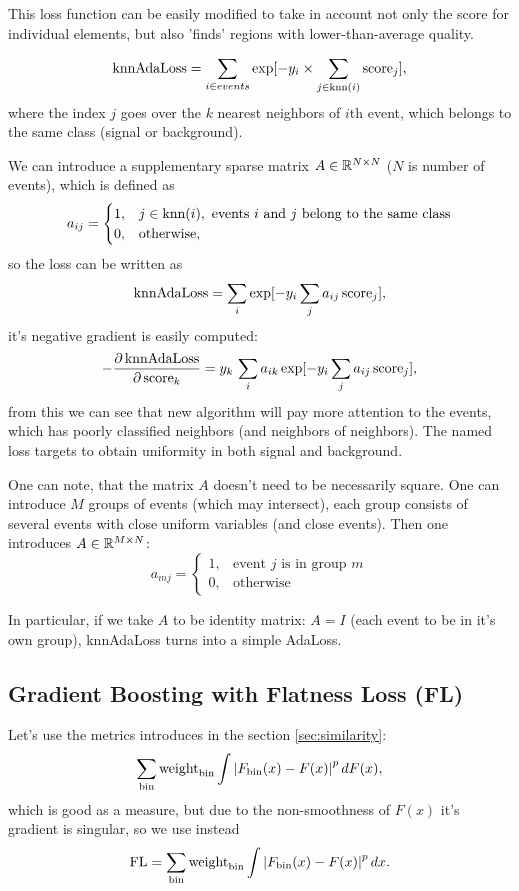 This loss function can be easily modified to take in account not only the score for individual elements, but also 'finds' regions with lower-than-average quality.

\[
	\text{knnAdaLoss} = \sum_{i \in events} \exp[-y_i \times \sum_{j \in \text{knn}(i)} \text{score}_j],
\]
where the index $j$ goes over the $k$ nearest neighbors of $i$th event, which belongs to the same class (signal or background).

We can introduce a supplementary sparse matrix $A \in \mathbb{R}^{N \times N}$ ($N$ is number of events), which is defined as 
\[
a_{ij} = \begin{cases} 
1, & j \in \text{knn}(i), \text{ events $i$ and $j$ belong to the same class} \\
0, & \text{otherwise},
\end{cases}
\] so the loss can be written as
\[
	\text{knnAdaLoss} = \sum_i \exp [- y_i \sum_j a_{ij} \, \text{score}_j ],
\]
it's negative gradient is easily computed:
\[
	-\dfrac{\partial \, \text{knnAdaLoss}} {\partial \, \text{score}_k} = 
	 y_k \, \sum_i a_{ik} \exp [- y_i \sum_j a_{ij} \, \text{score}_j ],
\]
from this we can see that new algorithm will pay more attention to the events, which has poorly classified neighbors (and neighbors of neighbors). The named loss targets to obtain uniformity in both signal and background.

One can note, that the matrix $A$ doesn't need to be necessarily square. One can introduce $M$ groups of events (which may intersect), each group consists of several events with close uniform variables (and close events). Then one introduces $A \in \mathbb{R}^{M \times N}$:
\[
	a_{mj} = \begin{cases}
		1, & \text{event $j$ is in group $m$} \\
		0, & \text{otherwise}
	\end{cases}
\]

In particular, if we take $A$ to be identity matrix: $A = I$ (each event to be in it's own group), knnAdaLoss turns into a simple AdaLoss.



\subsection{Gradient Boosting with Flatness Loss (FL)}

Let's use the metrics introduces in the section \ref{sec:similarity}:
\[
	\sum_{\text{bin}} \text{weight}_\text{bin} \int \left\vert F_{\text{bin}}(x) - F(x)\right\vert^p dF(x),
\]
which is good as a measure, but due to the non-smoothness of $F(x)$ it's 
gradient is singular, so we use instead
\[
	\text{FL} = \sum_{\text{bin}} \text{weight}_\text{bin} \int \left\vert F_{\text{bin}}(x) - F(x)\right\vert^p dx.
\]


